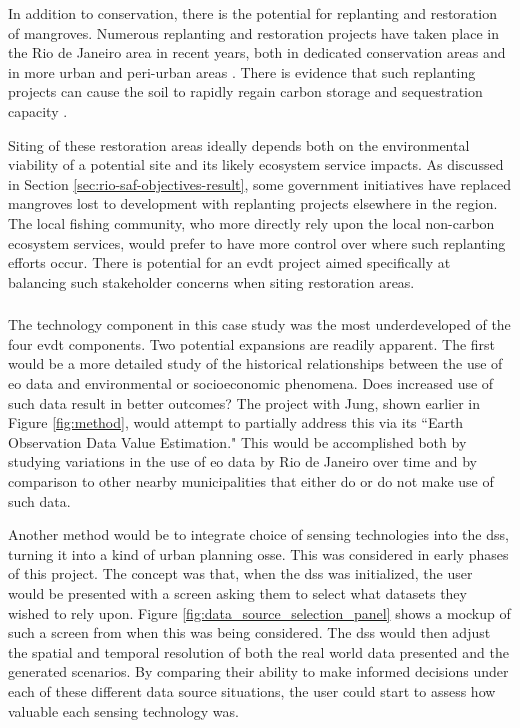 In addition to conservation, there is the potential for replanting and restoration of mangroves. Numerous replanting and restoration projects have taken place in the Rio de Janeiro area in recent years, both in dedicated conservation areas \cite{granadoAssessingGeneticDiversity2018} and in more urban and peri-urban areas \cite{rioprefeituraEnvironmentalRecoveryRodrigo2019, soaresEstruturaVegetalGrau1999}. There is evidence that such replanting projects can cause the soil to rapidly regain carbon storage and sequestration capacity \cite{jimenezRecoverySoilProcesses2022}.

Siting of these restoration areas ideally depends both on the environmental viability of a potential site and its likely ecosystem service impacts. As discussed in Section \ref{sec:rio-saf-objectives-result}, some government initiatives have replaced mangroves lost to development with replanting projects elsewhere in the region. The local fishing community, who more directly rely upon the local non-carbon ecosystem services, would prefer to have more control over where such replanting efforts occur. There is potential for an \ac{evdt} project aimed specifically at balancing such stakeholder concerns when siting restoration areas.


\subsubsection{}

The technology component in this case study was the most underdeveloped of the four \ac{evdt} components. Two potential expansions are readily apparent. The first would be a more detailed study of the historical relationships between the use of \ac{eo} data and environmental or socioeconomic phenomena. Does increased use of such data result in better outcomes? The project with Jung, shown earlier in Figure \ref{fig:method}, would attempt to partially address this via its ``Earth Observation Data Value Estimation." This would be accomplished both by studying variations in the use of \ac{eo} data by Rio de Janeiro over time and by comparison to other nearby municipalities that either do or do not make use of such data. 

Another method would be to integrate choice of sensing technologies into the \ac{dss}, turning it into a kind of urban planning \ac{osse}. This was considered in early phases of this project. The concept was that, when the \ac{dss} was initialized, the user would be presented with a screen asking them to select what datasets they wished to rely upon. Figure \ref{fig:data_source_selection_panel} shows a mockup of such a screen from when this was being considered. The \ac{dss} would then adjust the spatial and temporal resolution of both the real world data presented and the generated scenarios. By comparing their ability to make informed decisions under each of these different data source situations, the user could start to assess how valuable each sensing technology was. 

